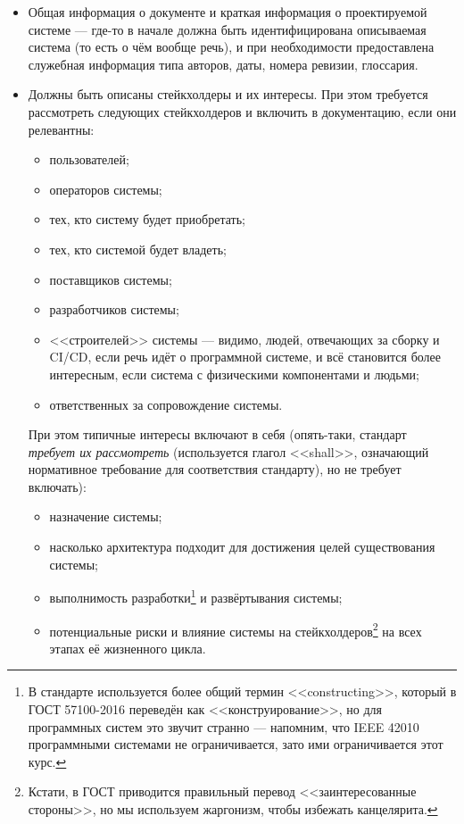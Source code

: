 \documentclass{../mcstext}
\begin{document}
\begin{itemize}
    \item Общая информация о документе и краткая информация о проектируемой системе --- где-то в начале должна быть идентифицирована описываемая система (то есть о чём вообще речь), и при необходимости предоставлена служебная информация типа авторов, даты, номера ревизии, глоссария.
    \item Должны быть описаны стейкхолдеры и их интересы. При этом требуется рассмотреть следующих стейкхолдеров и включить в документацию, если они релевантны:
        \begin{itemize}
            \item пользователей;
            \item операторов системы;
            \item тех, кто систему будет приобретать;
            \item тех, кто системой будет владеть;
            \item поставщиков системы;
            \item разработчиков системы;
            \item <<строителей>> системы --- видимо, людей, отвечающих за сборку и CI/CD, если речь идёт о программной системе, и всё становится более интересным, если система с физическими компонентами и людьми;
            \item ответственных за сопровождение системы.
        \end{itemize}
        При этом типичные интересы включают в себя (опять-таки, стандарт \emph{требует их рассмотреть} (используется глагол <<shall>>, означающий нормативное требование для соответствия стандарту), но не требует включать):
        \begin{itemize}
            \item назначение системы;
            \item насколько архитектура подходит для достижения целей существования системы;
            \item выполнимость разработки\footnote{В стандарте используется более общий термин <<constructing>>, который в ГОСТ 57100-2016 переведён как <<конструирование>>, но для программных систем это звучит странно --- напомним, что IEEE 42010 программными системами не ограничивается, зато ими ограничивается этот курс.} и развёртывания системы;
            \item потенциальные риски и влияние системы на стейкхолдеров\footnote{Кстати, в ГОСТ приводится правильный перевод <<заинтересованные стороны>>, но мы используем жаргонизм, чтобы избежать канцелярита.} на всех этапах её жизненного цикла.

\end{itemize}
\end{itemize}
\end{document}

